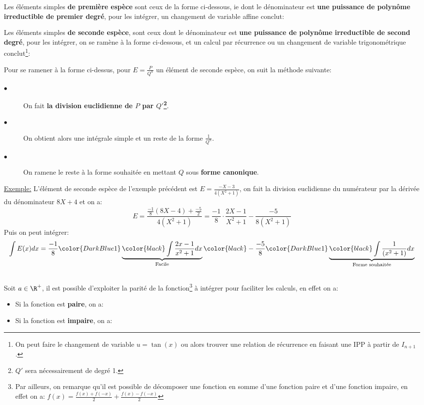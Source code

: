 Les éléments simples \textbf{de première espèce} sont ceux de la forme ci-dessous, ie dont le dénominateur est \textbf{une puissance de polynôme irreductible de premier degré}, pour les intégrer, un changement de variable affine conclut:

Les éléments simples \textbf{de seconde espèce}, sont ceux dont le dénominateur est \textbf{une puissance de polynôme irreductible de second degré}, pour les intégrer, on se ramène à la forme ci-dessous, et un calcul par récurrence ou un changement de variable trigonométrique conclut\footnote[1]{On peut faire le changement de variable \(u = \tan(x)\) ou alors trouver une relation de récurrence en faisant une IPP à partir de \(I_{n+1}\).}:

Pour se ramener à la forme ci-dessus, pour \(E = \frac{P}{Q^n}\) un élément de seconde espèce, on suit la méthode suivante:\+
\begin{description}
   \item[$\bullet$] On fait \textbf{la division euclidienne de \(P\) par \(Q'\)\footnote[2]{\(Q'\) sera nécessairement de degré 1.}}.
   \item[$\bullet$] On obtient alors une intégrale simple et un reste de la forme \(\frac{1}{Q^n}\).
   \item[$\bullet$] On ramene le reste à la forme souhaitée en mettant \(Q\) sous \textbf{forme canonique}.
\end{description}
\underline{Exemple:} L'élément de seconde espèce de l'exemple précédent est \(E = \frac{-X - 3}{4(X^2+1)}\), on fait la division euclidienne du numérateur par la dérivée du dénominateur \(8X + 4\) et on a:
\[
   E = \frac{\frac{-1}{8}(8X - 4) + \frac{-5}{2}}{4(X^2+1)} =  \frac{-1}{8} \cdot \frac{2X - 1}{X^2+1} - \frac{-5}{8(X^2 +1)}
\]
Puis on peut intégrer:
\[
   \int E(x) d x = \frac{-1}{8}  \color{DarkBlue1}\underbrace{\color{black} \int \frac{2x - 1}{x^2+1} d x}_\text{Facile}\color{black}  - \frac{-5}{8} \color{DarkBlue1}\underbrace{\color{black}\int \frac{1}{(x^2 +1)} d x}_\text{Forme souhaitée}
\]

\subsection*{}

Soit \(a \in \R^+\), il est possible d'exploiter la parité de la fonction\footnote[3]{Par ailleurs, on remarque qu'il est possible de décomposer une fonction en somme d'une fonction paire et d'une fonction impaire, en effet on a:
\(f(x) = \frac{f(x) + f(-x)}{2} + \frac{f(x) - f(-x)}{2}\)} à intégrer pour faciliter les calculs, en effet on a:
\begin{itemize}
   \item Si la fonction est \textbf{paire}, on a:
   \item Si la fonction est \textbf{impaire}, on a:
\end{itemize}


